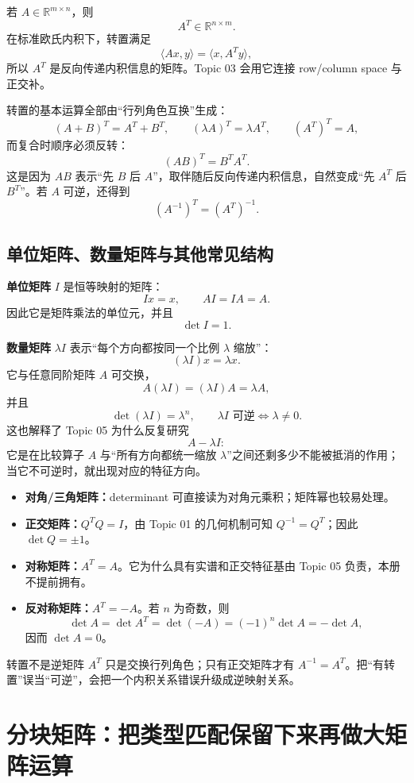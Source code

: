 \documentclass[11pt,a4paper]{ctexart}
\newcommand{\kw}[1]{\textbf{\color{deep}#1}}
\begin{document}
若 $A\in\mathbb R^{m\times n}$，则
\[
A^T\in\mathbb R^{n\times m}.
\]
在标准欧氏内积下，转置满足
\[
\langle Ax,y\rangle=\langle x,A^Ty\rangle,
\]
所以 $A^T$ 是反向传递内积信息的矩阵。Topic 03 会用它连接 row/column space 与正交补。

转置的基本运算全部由“行列角色互换”生成：
\[
(A+B)^T=A^T+B^T,
\qquad
(\lambda A)^T=\lambda A^T,
\qquad
(A^T)^T=A,
\]
而复合时顺序必须反转：
\[
\boxed{(AB)^T=B^TA^T.}
\]
这是因为 $AB$ 表示“先 $B$ 后 $A$”，取伴随后反向传递内积信息，自然变成“先 $A^T$ 后 $B^T$”。若 $A$ 可逆，还得到
\[
(A^{-1})^T=(A^T)^{-1}.
\]

\subsection{单位矩阵、数量矩阵与其他常见结构}

\kw{单位矩阵} $I$ 是恒等映射的矩阵：
\[
Ix=x,
\qquad
AI=IA=A.
\]
因此它是矩阵乘法的单位元，并且
\[
\det I=1.
\]

\kw{数量矩阵} $\lambda I$ 表示“每个方向都按同一个比例 $\lambda$ 缩放”：
\[
(\lambda I)x=\lambda x.
\]
它与任意同阶矩阵 $A$ 可交换，
\[
A(\lambda I)=(\lambda I)A=\lambda A,
\]
并且
\[
\det(\lambda I)=\lambda^n,
\qquad
\lambda I\text{ 可逆}\iff\lambda\neq0.
\]
这也解释了 Topic 05 为什么反复研究
\[
A-\lambda I:
\]
它是在比较算子 $A$ 与“所有方向都统一缩放 $\lambda$”之间还剩多少不能被抵消的作用；当它不可逆时，就出现对应的特征方向。

\begin{itemize}
  \item \kw{对角/三角矩阵：}determinant 可直接读为对角元乘积；矩阵幂也较易处理。
  \item \kw{正交矩阵：}$Q^TQ=I$，由 Topic 01 的几何机制可知 $Q^{-1}=Q^T$；因此 $\det Q=\pm1$。
  \item \kw{对称矩阵：}$A^T=A$。它为什么具有实谱和正交特征基由 Topic 05 负责，本册不提前拥有。
  \item \kw{反对称矩阵：}$A^T=-A$。若 $n$ 为奇数，则
  \[
  \det A=\det A^T=\det(-A)=(-1)^n\det A=-\det A,
  \]
  因而 $\det A=0$。
\end{itemize}

\begin{warnbox}{转置不是逆矩阵}
$A^T$ 只是交换行列角色；只有正交矩阵才有 $A^{-1}=A^T$。把“有转置”误当“可逆”，会把一个内积关系错误升级成逆映射关系。
\end{warnbox}

\section{分块矩阵：把类型匹配保留下来再做大矩阵运算}
\end{document}
